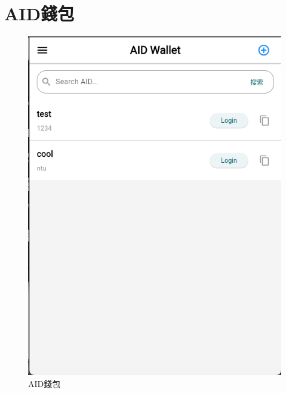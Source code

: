 
\section{AID錢包}
\begin{figure}
  \centering
  \includegraphics[width=\linewidth]{figures/wallet-demo.png}
  \caption{AID錢包}
\end{figure}
